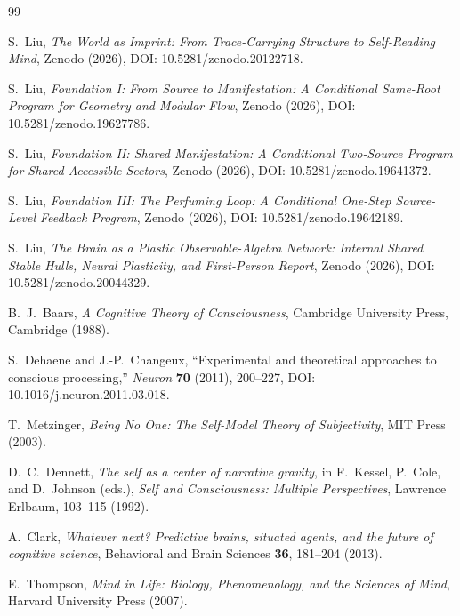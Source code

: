 \documentclass[12pt]{article}
\begin{document}
\begin{thebibliography}{99}

S.~Liu,
\emph{The World as Imprint: From Trace-Carrying Structure to Self-Reading Mind},
Zenodo (2026), DOI: 10.5281/zenodo.20122718.

S.~Liu,
\emph{Foundation I: From Source to Manifestation: A Conditional Same-Root Program for Geometry and Modular Flow},
Zenodo (2026), DOI: 10.5281/zenodo.19627786.

S.~Liu,
\emph{Foundation II: Shared Manifestation: A Conditional Two-Source Program for Shared Accessible Sectors},
Zenodo (2026), DOI: 10.5281/zenodo.19641372.

S.~Liu,
\emph{Foundation III: The Perfuming Loop: A Conditional One-Step Source-Level Feedback Program},
Zenodo (2026), DOI: 10.5281/zenodo.19642189.

S.~Liu,
\emph{The Brain as a Plastic Observable-Algebra Network: Internal Shared Stable Hulls, Neural Plasticity, and First-Person Report},
Zenodo (2026), DOI: 10.5281/zenodo.20044329.

B.~J.~Baars,
\emph{A Cognitive Theory of Consciousness},
Cambridge University Press, Cambridge (1988).

S.~Dehaene and J.-P.~Changeux,
``Experimental and theoretical approaches to conscious processing,''
\emph{Neuron} \textbf{70} (2011), 200--227,
DOI: 10.1016/j.neuron.2011.03.018.

T.~Metzinger,
\emph{Being No One: The Self-Model Theory of Subjectivity},
MIT Press (2003).

D.~C.~Dennett,
\emph{The self as a center of narrative gravity},
in F.~Kessel, P.~Cole, and D.~Johnson (eds.),
\emph{Self and Consciousness: Multiple Perspectives},
Lawrence Erlbaum, 103--115 (1992).

A.~Clark,
\emph{Whatever next? Predictive brains, situated agents, and the future of cognitive science},
Behavioral and Brain Sciences \textbf{36}, 181--204 (2013).

E.~Thompson,
\emph{Mind in Life: Biology, Phenomenology, and the Sciences of Mind},
Harvard University Press (2007).

\end{thebibliography}
\end{document}
